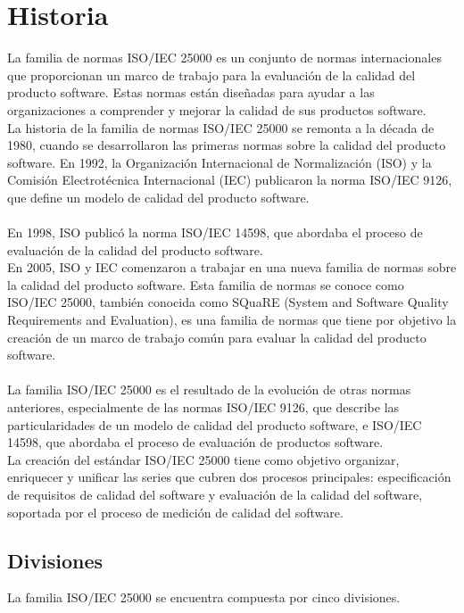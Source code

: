 \documentclass[https://www.overleaf.com/project/63761df255a8a9f4a15c3579
	letterpaper, %
	10pt, %
]{CSUniSchoolLabReport}
\begin{document}
    \section{Historia}
        La familia de normas ISO/IEC 25000 es un conjunto de normas internacionales que proporcionan un marco de trabajo para la evaluación de la calidad del producto software. Estas normas están diseñadas para ayudar a las organizaciones a comprender y mejorar la calidad de sus productos software.
        \\
        La historia de la familia de normas ISO/IEC 25000 se remonta a la década de 1980, cuando se desarrollaron las primeras normas sobre la calidad del producto software. En 1992, la Organización Internacional de Normalización (ISO) y la Comisión Electrotécnica Internacional (IEC) publicaron la norma ISO/IEC 9126, que define un modelo de calidad del producto software. 
        \\\\
        En 1998, ISO publicó la norma ISO/IEC 14598, que abordaba el proceso de evaluación de la calidad del producto software.
        \\
        En 2005, ISO y IEC comenzaron a trabajar en una nueva familia de normas sobre la calidad del producto software. Esta familia de normas se conoce como ISO/IEC 25000, también conocida como SQuaRE (System and Software Quality Requirements and Evaluation), es una familia de normas que tiene por objetivo la creación de un marco de trabajo común para evaluar la calidad del producto software.
        \\\\
        La familia ISO/IEC 25000 es el resultado de la evolución de otras normas anteriores, especialmente de las normas ISO/IEC 9126, que describe las particularidades de un modelo de calidad del producto software, e ISO/IEC 14598, que abordaba el proceso de evaluación de productos software. 
        \\
        La creación del estándar ISO/IEC 25000 tiene como objetivo organizar, enriquecer y unificar las series que cubren dos procesos principales: especificación de requisitos de calidad del software y evaluación de la calidad del software, soportada por el proceso de medición de calidad del software.
    
    \subsection{Divisiones}
        La familia ISO/IEC 25000 se encuentra compuesta por cinco divisiones.
\end{document}
